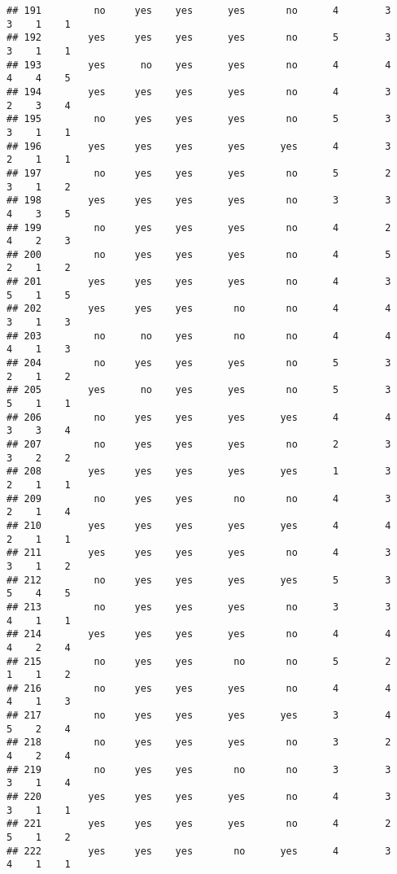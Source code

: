 \documentclass[
]{article}
\begin{document}
\begin{verbatim}
## 191         no     yes    yes      yes       no      4        3     3    1    1
## 192        yes     yes    yes      yes       no      5        3     3    1    1
## 193        yes      no    yes      yes       no      4        4     4    4    5
## 194        yes     yes    yes      yes       no      4        3     2    3    4
## 195         no     yes    yes      yes       no      5        3     3    1    1
## 196        yes     yes    yes      yes      yes      4        3     2    1    1
## 197         no     yes    yes      yes       no      5        2     3    1    2
## 198        yes     yes    yes      yes       no      3        3     4    3    5
## 199         no     yes    yes      yes       no      4        2     4    2    3
## 200         no     yes    yes      yes       no      4        5     2    1    2
## 201        yes     yes    yes      yes       no      4        3     5    1    5
## 202        yes     yes    yes       no       no      4        4     3    1    3
## 203         no      no    yes       no       no      4        4     4    1    3
## 204         no     yes    yes      yes       no      5        3     2    1    2
## 205        yes      no    yes      yes       no      5        3     5    1    1
## 206         no     yes    yes      yes      yes      4        4     3    3    4
## 207         no     yes    yes      yes       no      2        3     3    2    2
## 208        yes     yes    yes      yes      yes      1        3     2    1    1
## 209         no     yes    yes       no       no      4        3     2    1    4
## 210        yes     yes    yes      yes      yes      4        4     2    1    1
## 211        yes     yes    yes      yes       no      4        3     3    1    2
## 212         no     yes    yes      yes      yes      5        3     5    4    5
## 213         no     yes    yes      yes       no      3        3     4    1    1
## 214        yes     yes    yes      yes       no      4        4     4    2    4
## 215         no     yes    yes       no       no      5        2     1    1    2
## 216         no     yes    yes      yes       no      4        4     4    1    3
## 217         no     yes    yes      yes      yes      3        4     5    2    4
## 218         no     yes    yes      yes       no      3        2     4    2    4
## 219         no     yes    yes       no       no      3        3     3    1    4
## 220        yes     yes    yes      yes       no      4        3     3    1    1
## 221        yes     yes    yes      yes       no      4        2     5    1    2
## 222        yes     yes    yes       no      yes      4        3     4    1    1

\end{verbatim}
\end{document}

